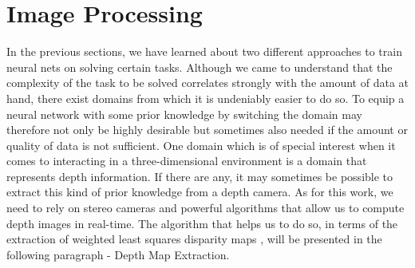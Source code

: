 \FloatBarrier
\section{Image Processing}
\label{sec::224_ip}
In the previous sections, we have learned about two different approaches to train neural nets on solving certain tasks. Although we came to understand that the complexity of the task to be solved correlates strongly with the amount of data at hand, there exist domains from which it is undeniably easier to do so. To equip a neural network with some prior knowledge by switching the domain may therefore not only be highly desirable but sometimes also needed if the amount or quality of data is not sufficient. One domain which is of special interest when it comes to interacting in a three-dimensional environment is a domain that represents depth information. If there are any, it may sometimes be possible to extract this kind of prior knowledge from a depth camera. As for this work, we need to rely on stereo cameras and powerful algorithms that allow us to compute depth images in real-time. The algorithm that helps us to do so, in terms of the extraction of weighted least squares disparity maps \cite{min2014fast}, will be presented in the following paragraph - Depth Map Extraction.
\FloatBarrier
